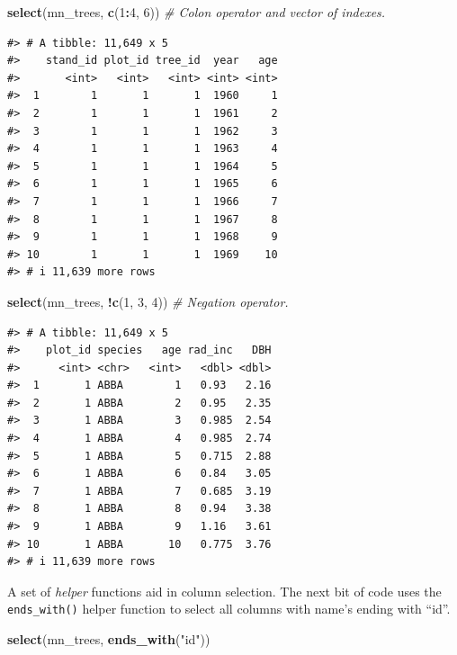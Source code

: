 \documentclass[
  11pt,
]{krantz}
\newenvironment{Shaded}{\begin{snugshade}}{\end{snugshade}}
\newcommand{\CommentTok}[1]{\textcolor[rgb]{0.56,0.35,0.01}{\textit{#1}}}
\newcommand{\DecValTok}[1]{\textcolor[rgb]{0.00,0.00,0.81}{#1}}
\newcommand{\KeywordTok}[1]{\textcolor[rgb]{0.13,0.29,0.53}{\textbf{#1}}}
\newcommand{\NormalTok}[1]{#1}
\newcommand{\OperatorTok}[1]{\textcolor[rgb]{0.81,0.36,0.00}{\textbf{#1}}}
\newcommand{\StringTok}[1]{\textcolor[rgb]{0.31,0.60,0.02}{#1}}
\theoremstyle{definition}
\theoremstyle{definition}
\theoremstyle{definition}
\theoremstyle{definition}
\theoremstyle{remark}
\begin{document}
\begin{Shaded}
\begin{Highlighting}[]
\KeywordTok{select}\NormalTok{(mn\_trees, }\KeywordTok{c}\NormalTok{(}\DecValTok{1}\OperatorTok{:}\DecValTok{4}\NormalTok{, }\DecValTok{6}\NormalTok{)) }\CommentTok{\# Colon operator and vector of indexes.}
\end{Highlighting}
\end{Shaded}

\begin{verbatim}
#> # A tibble: 11,649 x 5
#>    stand_id plot_id tree_id  year   age
#>       <int>   <int>   <int> <int> <int>
#>  1        1       1       1  1960     1
#>  2        1       1       1  1961     2
#>  3        1       1       1  1962     3
#>  4        1       1       1  1963     4
#>  5        1       1       1  1964     5
#>  6        1       1       1  1965     6
#>  7        1       1       1  1966     7
#>  8        1       1       1  1967     8
#>  9        1       1       1  1968     9
#> 10        1       1       1  1969    10
#> # i 11,639 more rows
\end{verbatim}

\begin{Shaded}
\begin{Highlighting}[]
\KeywordTok{select}\NormalTok{(mn\_trees, }\OperatorTok{!}\KeywordTok{c}\NormalTok{(}\DecValTok{1}\NormalTok{, }\DecValTok{3}\NormalTok{, }\DecValTok{4}\NormalTok{)) }\CommentTok{\# Negation operator.}
\end{Highlighting}
\end{Shaded}

\begin{verbatim}
#> # A tibble: 11,649 x 5
#>    plot_id species   age rad_inc   DBH
#>      <int> <chr>   <int>   <dbl> <dbl>
#>  1       1 ABBA        1   0.93   2.16
#>  2       1 ABBA        2   0.95   2.35
#>  3       1 ABBA        3   0.985  2.54
#>  4       1 ABBA        4   0.985  2.74
#>  5       1 ABBA        5   0.715  2.88
#>  6       1 ABBA        6   0.84   3.05
#>  7       1 ABBA        7   0.685  3.19
#>  8       1 ABBA        8   0.94   3.38
#>  9       1 ABBA        9   1.16   3.61
#> 10       1 ABBA       10   0.775  3.76
#> # i 11,639 more rows
\end{verbatim}

A set of \emph{helper} functions aid in column selection. The next bit of code uses the \texttt{ends\_with()} helper function to select all columns with name's ending with ``id''.

\begin{Shaded}
\begin{Highlighting}[]
\KeywordTok{select}\NormalTok{(mn\_trees, }\KeywordTok{ends\_with}\NormalTok{(}\StringTok{"id"}\NormalTok{))}
\end{Highlighting}
\end{Shaded}
\end{document}
